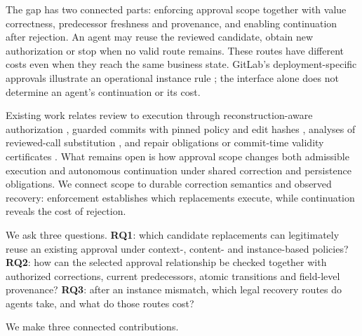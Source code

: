 \documentclass[pdflatex,sn-basic]{sn-jnl}
\begin{document}
The gap has two connected parts: enforcing approval scope together with value correctness, predecessor freshness and provenance, and enabling continuation after rejection. An agent may reuse the reviewed candidate, obtain new authorization or stop when no valid route remains. These routes have different costs even when they reach the same business state. GitLab's deployment-specific approvals illustrate an operational instance rule \citep{gitlab-deployment-approval}; the interface alone does not determine an agent's continuation or its cost.

Existing work relates review to execution through reconstruction-aware authorization \citep{zhu2026resa}, guarded commits with pinned policy and edit hashes \citep{bindschaedler2026guarded}, analyses of reviewed-call substitution \citep{kumar2026loopjacking,wang2026approval}, and repair obligations or commit-time validity certificates \citep{wang2026acg,qi2026revise}. What remains open is how approval scope changes both admissible execution and autonomous continuation under shared correction and persistence obligations. We connect scope to durable correction semantics and observed recovery: enforcement establishes which replacements execute, while continuation reveals the cost of rejection.

We ask three questions. \textbf{RQ1}: which candidate replacements can legitimately reuse an existing approval under context-, content- and instance-based policies? \textbf{RQ2}: how can the selected approval relationship be checked together with authorized corrections, current predecessors, atomic transitions and field-level provenance? \textbf{RQ3}: after an instance mismatch, which legal recovery routes do agents take, and what do those routes cost?

We make three connected contributions.
\end{document}
